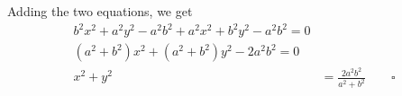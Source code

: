 \documentclass{report}
\newcommand{\eos}{ \qquad \square}
\begin{document}
\begin{enumerate}[leftmargin=*]
          Adding the two equations, we get
          \begin{align*}
              b^2x^2 + a^2y^2 - a^2b^2 + a^2x^2 + b^2y^2 - a^2b^2 = 0 \\
              (a^2 + b^2)x^2 + (a^2 + b^2)y^2 - 2a^2b^2 = 0           \\
              x^2 + y^2 & = \frac{2a^2b^2}{a^2 + b^2} \eos
          \end{align*}

\end{enumerate}
\end{document}
